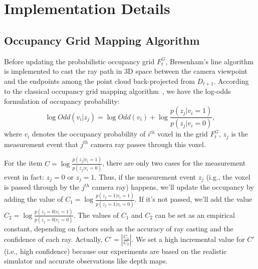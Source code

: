 \clearpage
\maketitlesupplementary
\appendix


\section{Implementation Details}
\subsection{Occupancy Grid Mapping Algorithm}
\label{app:grid}
     Before updating the probabilistic occupancy grid $F^G_t$, Bresenham's line algorithm is implemented to cast the ray path in 3D space between the camera viewpoint and the endpoints among the point cloud back-projected from $D_{t+1}$. %
     According to the classical occupancy grid mapping algorithm~\citep{thrun2002probabilistic}, we have the log-odds formulation of occupancy probability:
    \begin{equation}
        \label{eqn:OGM}
        \log Odd(v_i|z_j) = \log Odd(v_i) + \log\frac{p(z_j|v_i=1)}{p(z_j|v_i=0)},
    \end{equation}
    where $v_i$ denotes the occupancy probability of $i^{th}$ voxel in the grid $F^G_t$, $z_j$ is the measurement event that $j^{th}$ camera ray passes through this voxel. 

    For the item $C=\log\frac{p(z_j|v_i=1)}{p(z_j|v_i=0)}$, there are only two cases for the measurement event in fact: $z_j=0$ or $z_j=1$. Thus, if the measurement event $z_j$ (i.g., the voxel is passed through by the $j^{th}$ camera ray) happens, we’ll update the occupancy by adding the value of $C_1=\log\frac{p(z_j = 1 | v_i = 1)}{p(z_j = 1 | v_i = 0)}$. If it’s not passed, we’ll add the value $C_2 = \log\frac{p(z_j = 0 | v_i = 1)}{p(z_j = 0 | v_i = 0)}$. The values of $C_1$ and $C_2$ can be set as an empirical constant, depending on factors such as the accuracy of ray casting and the confidence of each ray. Actually, $C’ = |\frac{C_1}{C_2}|$. We set a high incremental value for $C'$ (i.e., high confidence) because our experiments are based on the realistic simulator and accurate observations like depth maps.


